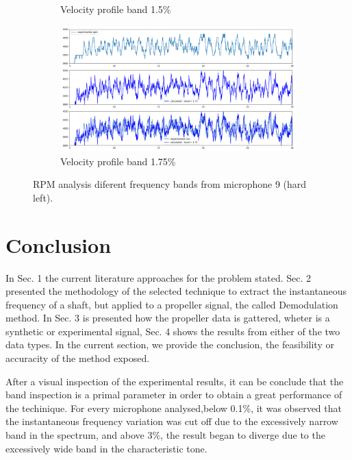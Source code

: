 \documentclass[10pt,fleqn,a4paper,twoside]{article}
\begin{document}
\begin{figure}[H]
\begin{subfigure}{0.4\textwidth}
            \caption{Velocity profile band 1.5\%}
            \label{fig:sixth}
        \end{subfigure}
        \centering
        \hfill
        \begin{subfigure}{0.4\textwidth}
            \includegraphics[width=\textwidth]{Figures/rpm_analysis_mic8_band_1.75.png}
            \caption{Velocity profile band 1.75\%}
            \label{fig:seventh}
        \end{subfigure}
                
        \caption{RPM analysis diferent frequency bands from microphone 9 (hard left).}
        \label{fig:figures}
        \end{figure}
\section{Conclusion}
In Sec. 1 the current literature approaches for the problem stated. Sec. 2 presented the methodology of the selected technique to extract the instantaneous frequency of a shaft, but applied to a propeller signal, the called Demodulation method. In Sec. 3 is presented how the propeller data is gattered, wheter is a synthetic or experimental signal, Sec. 4 shows the results from either of the two data types. In the current section, we provide the conclusion, the feasibility or accuracity of the method exposed.

After a visual inspection of the experimental results, it can be conclude that the band inspection is a primal parameter in order to obtain a great performance of the techinique. For every microphone analysed,below 0.1\%, it was observed that the instantaneous frequency variation was cut off due to the excessively narrow band in the spectrum, and above 3\%, the result began to diverge due to the excessively wide band in the characteristic tone. 
\end{document}
